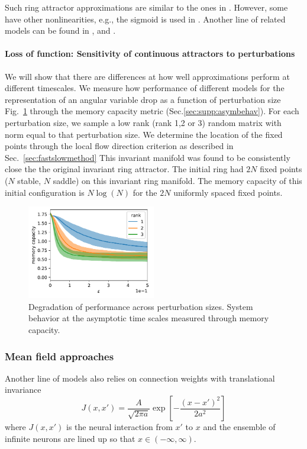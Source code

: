\documentclass{article} %
\newcounter{ct}
\theoremstyle{definition}
\theoremstyle{remark}
\begin{document}
 Such ring attractor approximations are similar to the ones in \citep{goodridge2000,samsonovich1997path,redish1996coupled, tsodyks1995associative}. %
However, some have other nonlinearities, e.g.,  the sigmoid is used in \citep{goodridge2000}.
Another line of related models can be found in \citep{Burak2009}, \citep{couey2013} and \citep{spalla2021continuous}.



\paragraph{Loss of function: Sensitivity of continuous attractors to perturbations}\label{sec:supp:boa}
We will show that there are differences at how well approximations perform at different timescales.
We measure how performance of different models for the representation of an angular variable drop as a function of perturbation size Fig.~\ref{fig:performance} through the memory capacity metric (Sec.\ref{sec:supp:asymbehav}).
For each perturbation size, we sample a low rank (rank 1,2 or 3) random matrix with norm equal to that perturbation size.
We determine the location of the fixed points through the local flow direction criterion as described in Sec.~\ref{sec:fastslowmethod}
This invariant manifold was found to be consistently close the the original invariant ring attractor.
The initial ring had \(2N\) fixed points (\(N\) stable, \(N\) saddle) on this invariant ring manifold.
The memory capacity of this initial configuration is \(N\log(N)\) for the \(2N\) uniformly spaced fixed points.

\begin{figure}[tbhp]
  \centering
  \includegraphics[width=0.5\textwidth]{performance2}
  \caption{Degradation of performance across perturbation sizes. System behavior at the asymptotic time scales measured through memory capacity. }\label{fig:performance}
\end{figure}



\subsubsection{Mean field approaches}
Another line of models	\citep{miller2006analysis,wu2008dynamics,fung2010} also relies on connection weights with translational invariance
\begin{equation}
J(x, x') = \frac{A}{\sqrt{2\pi a}} \exp\left[ -\frac{(x - x')^2}{2a^2} \right]
\end{equation}
where \(J (x, x')\) is the neural interaction from \(x'\) to \(x\) and the ensemble of infinite neurons are lined up so that \(x\in (-\infty, \infty)\).
\end{document}
